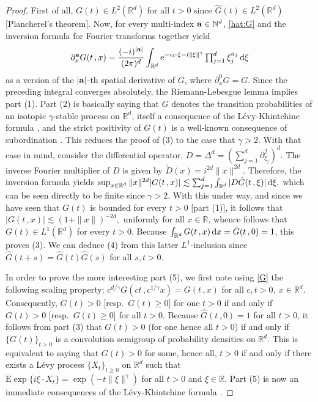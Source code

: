 \documentclass[reqno]{amsart}
\newcommand{\<}{\langle}
\renewcommand{\>}{\rangle}
\newcommand{\N}{\mathbb{N}}
\newcommand{\R}{\mathbb{R}}
\newcommand{\E}{\mathrm{E}}
\newcommand{\1}{\mathbb{1}}
\renewcommand{\d}{{\rm d}}
\newcommand{\e}{{\rm e}}
\renewcommand{\ge}{\geqslant}
\theoremstyle{definition}
\numberwithin{equation}{section}
\begin{document}
\begin{proof}
	First of all, $G(t)\in L^2(\R^d)$ for all $t>0$ since
	$\hat{G}(t)\in L^2(\R^d)$ [Plancherel's theorem].
	Now, for every multi-index ${\bf a}\in \N^d$,
	\eqref{hat:G} and the inversion formula for Fourier transforms together yield
	\begin{equation}\label{G}
		\partial^{{\bf a}}_x G(t\,,x)= \frac{(-i)^{|{\bf a}|}}{(2\pi)^d}\int_{\R^d}
		\e^{-ix\cdot \xi - t\| \xi \|^\gamma}\textstyle\prod_{j=1}^d\xi_j^{a_j}\,\d\xi
	\end{equation}
	as a version of the $|{\bf a}|$-th spatial derivative of $G$, where $\partial^0_x G=G$. 
	Since the preceding integral converges absolutely, the Riemann-Lebesgue lemma implies part (1). Part (2)
	is basically saying that $G$ denotes the transition probabilities of an isotopic
	$\gamma$-stable process on $\R^d$, itself a consequence of the L\'evy-Khintchine
	formula \cite{Bertoin,Kyprianou,Sato}, and the strict positivity of
	$G(t)$ is a well-known consequence of subordination \cite{Sato}. 
	This reduces the proof of (3)
	to the case that $\gamma>2$. With that case in mind, 
	consider the differential operator,
	$D = \Delta^d = (\sum_{j=1}^{d}\partial^{2}_{\xi_j})^d.$
	The inverse Fourier multiplier of $D$ is given by $\check{D}(x) = i^{2d}\|x\|^{2d}$.
	Therefore, the inversion formula yields
	$\sup_{x\in\R^d} \|x\|^{2d}  |G(t\,,x)| 
	\lesssim \sum_{j=1}^d \int_{\R^d} | D\hat{G}(t\,,\xi)|\,\d\xi,$
	which can be seen directly to be finite since $\gamma>2$.
	With this under way, and since we have seen that $G(t)$ is bounded for every $t>0$
	[part (1)],  it follows that $|G(t\,,x)| \lesssim (1+\|x\|)^{-2d},$
	uniformly for
	all $x\in\R$, whence follows that $G(t)\in L^1(\R^d)$ for every $t>0$.
	Because $\int_{\R^d}G(t\,,x)\,\d x =\hat{G}(t\,,0)=1$, this proves (3).
	We can deduce (4) from this latter $L^1$-inclusion
	since $\hat{G}(t+s)=\hat{G}(t)\hat{G}(s)$ for all $s,t>0$.

	In order to prove the more interesting part (5), we first note 
	using \eqref{G} the following scaling property:
	$c^{d/\gamma}G(ct\,,c^{1/\gamma}x) = G(t\,,x)$
	for all $c,t>0,\ x\in\R^d.$
	Consequently, $G(t)>0$ [resp.\
	$G(t)\ge0$] for one $t>0$ if and only if $G(t)>0$  [resp.\ $G(t)\ge0$]  for all $t>0$.
	Because $\hat{G}(t\,,0)=1$ for all $t>0$, it follows from part (3)
	that $G(t)>0$ (for one hence all $t>0$)
	if and only if $\{G(t)\}_{t>0}$ is a convolution semigroup of probability densities on $\R^d$. 
	This is equivalent to saying that $G(t)>0$ for some, hence all, $t>0$
	if and only if there exists a L\'evy process
	$\{X_t\}_{t\ge0}$ on $\R^d$ such that 
	$\E\exp\{i\xi \cdot X_t\}=\exp(-t \| \xi \|^\gamma)$
	for all $t>0$ and $\xi\in\R$. Part (5) 
	is now an immediate consequences of the L\'evy-Khintchine formula \cite{Sato,Bertoin,Kyprianou}.
\end{proof}
\end{document}
